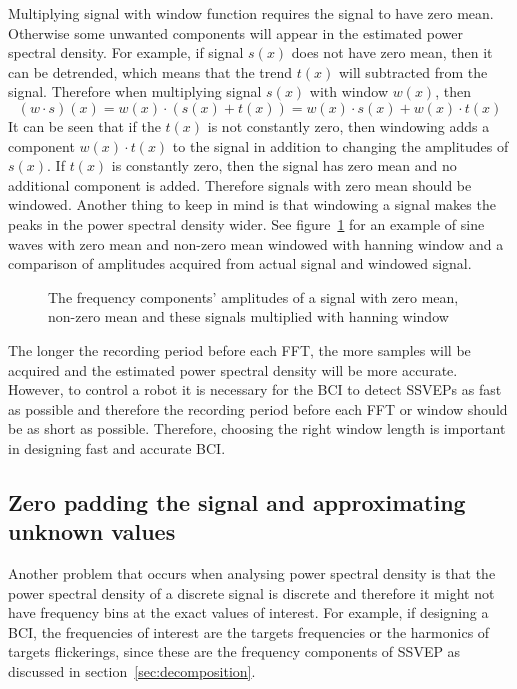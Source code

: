 Multiplying signal with window function requires the signal to have zero mean. Otherwise some unwanted components will appear in the estimated \gls{power spectral density}. For example, if signal $s(x)$ does not have zero mean, then it can be detrended, which means that the trend $t(x)$ will subtracted from the signal. Therefore when multiplying signal $s(x)$ with window $w(x)$, then
\begin{equation}
	(w\cdot s)(x) = w(x)\cdot(s(x)+t(x))=w(x)\cdot s(x)+w(x)\cdot t(x)
\end{equation}
It can be seen that if the $t(x)$ is not constantly zero, then windowing adds a component $w(x)\cdot t(x)$ to the signal in addition to changing the amplitudes of $s(x)$. If $t(x)$ is constantly zero, then the signal has zero mean and no additional component is added. Therefore signals with zero mean should be windowed. Another thing to keep in mind is that windowing a signal makes the peaks in the \gls{power spectral density} wider. See figure~\ref{fig:window} for an example of sine waves with zero mean and non-zero mean windowed with hanning window and a comparison of amplitudes acquired from actual signal and windowed signal.

\begin{figure}[h!]
	
	\caption{The frequency components' amplitudes of a signal with zero mean, non-zero mean and these signals multiplied with hanning window}
	\label{fig:window}
\end{figure}

The longer the recording period before each \gls{FFT}, the more samples will be acquired and the estimated \gls{power spectral density} will be more accurate. However, to control a robot it is necessary for the \gls{BCI} to detect \glspl{SSVEP} as fast as possible and therefore the recording period before each \gls{FFT} or window should be as short as possible. Therefore, choosing the right window length is important in designing fast and accurate \gls{BCI}.

\subsection{Zero padding the signal and approximating unknown values}

Another problem that occurs when analysing \gls{power spectral density} is that the \gls{power spectral density} of a discrete signal is discrete and therefore it might not have frequency bins at the exact values of interest. For example, if designing a \gls{BCI}, the frequencies of interest are the \glspl{target} frequencies or the \glspl{harmonic} of \glspl{target} \glspl{flickering}, since these are the \glspl{frequency component} of \gls{SSVEP} as discussed in section~\ref{sec:decomposition}.

